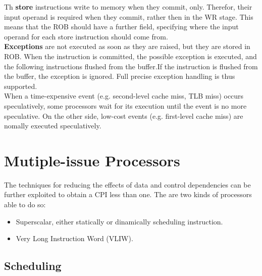\documentclass[12pt]{article}
\begin{document}
Th \textbf{store} instructions write to memory when they commit, only. Therefor, their input operand is required when they commit, rather then in the WR stage. This means that the ROB should have a further field, specifying where the input operand for each store instruction should come from.\\
\textbf{Exceptions} are not executed as soon as they are raised, but they are stored in ROB. When the instruction is committed, the possible exception is executed, and the following instructions flushed from the buffer.If the instruction is flushed from the buffer, the exception is ignored. Full precise exception handling is thus supported.\\

When a time-expensive event (e.g. second-level cache miss, TLB miss) occurs speculatively, some processors wait for its execution until the event is no more speculative. On the other side, low-cost events (e.g. first-level cache miss) are nomally executed speculatively.

\section{Mutiple-issue Processors}
The techniques for reducing the effects of data and control dependencies can be further exploited to obtain a CPI less than one. The are two kinds of processors able to do so:
\begin{itemize}
  \item Superscalar, either statically or dinamically scheduling instruction.
  \item Very Long Instruction Word (VLIW).
\end{itemize}

\subsection{Scheduling}
\end{document}
